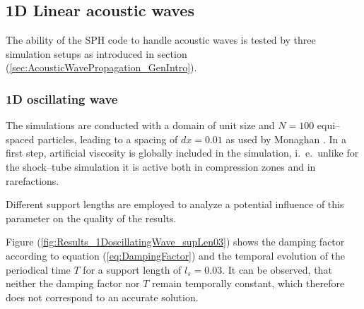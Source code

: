 \documentclass{report}
\makeatletter
\renewcommand\paragraph{\@startsection{paragraph}{4}{\z@}%
  {-3.25ex\@plus -1ex \@minus -.2ex}%
  {1.5ex \@plus .2ex}%
  {\normalfont\normalsize\bfseries}}
\makeatother
\begin{document}




\subsection{1D Linear acoustic waves}
\label{sec:Results_1DLinearAcousticWaves}
The ability of the SPH code to handle acoustic waves is tested by three simulation setups as introduced in section (\ref{sec:AcousticWavePropagation_GenIntro}). 



\subsubsection{1D oscillating wave}
\label{sec:Results_1DoscillatingWave}
The simulations are conducted with a domain of unit size and $N=100$ equi--spaced particles, leading to a spacing of $dx=0.01$ as used by Monaghan \cite{Monaghan2005}.
In a first step, artificial viscosity is globally included in the simulation, i.\ e.\ unlike for the shock--tube simulation it is active both in compression zones and in rarefactions. 

Different support lengths are employed to analyze a potential influence of this parameter on the quality of the results.

 Figure (\ref{fig:Results_1DoscillatingWave_supLen03}) shows the damping factor according to equation (\ref{eq:DampingFactor}) and the temporal evolution of the periodical time $T$ for a support length of $l_s=0.03$. It can be observed, that neither the damping factor nor $T$ remain temporally constant, which therefore does not correspond to an accurate solution.  
\end{document}
